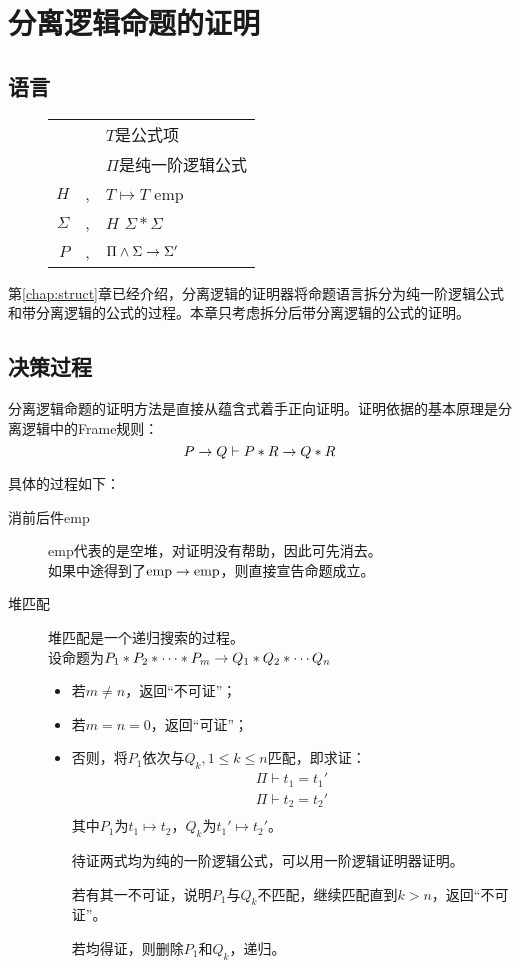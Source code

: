 \chapter{分离逻辑命题的证明}
\label{chap:sep}

\section{语言}
\begin{figure}[!htbp]
  \centering
  \begin{tabular}[rcl]{rcl}
    & & $T$是公式项 \\
    & & $\Pi$是纯一阶逻辑公式 \\
    $H$ & \sep{} & $T \mapsto T$ \deli{} emp \\
    $\Sigma$ & \sep{} & $H$ \deli{} $\Sigma \ast \Sigma$ \\
    $P$ & \sep{} & $\Pi \land \Sigma \rightarrow \Sigma'$ \\
  \end{tabular}
\end{figure}
第\ref{chap:struct}章已经介绍，分离逻辑的证明器将命题语言拆分为纯一阶逻辑公式和带分离逻辑的公式的过程。本章只考虑拆分后带分离逻辑的公式的证明。

\section{决策过程}
分离逻辑命题的证明方法是直接从蕴含式着手正向证明。证明依据的基本原理是分离逻辑中的Frame规则：
$$ P \rightarrow Q \vdash P \ast R \rightarrow Q \ast R$$

具体的过程如下：
\begin{description}
  \item[消前后件emp] emp代表的是空堆，对证明没有帮助，因此可先消去。\\
    如果中途得到了$\mathrm{emp} \rightarrow \mathrm{emp}$，则直接宣告命题成立。
  \item[堆匹配] 堆匹配是一个递归搜索的过程。\\
    设命题为$P_1 \ast P_2 \ast \cdots \ast P_m \rightarrow Q_1 \ast Q_2 \ast \cdots Q_n$
    \begin{itemize}
      \item 若$m \neq n$，返回``不可证''；
      \item 若$m = n = 0$，返回``可证''；
      \item 否则，将$P_1$依次与$Q_k, 1 \leq k \leq n$匹配，即求证：
        \begin{eqnarray*}
          \Pi \vdash t_1 = t_1' \\
          \Pi \vdash t_2 = t_2' \\
        \end{eqnarray*}
        其中$P_1$为$t_1 \mapsto t_2$，$Q_k$为$t_1' \mapsto t_2'$。

        待证两式均为纯的一阶逻辑公式，可以用一阶逻辑证明器证明。

        若有其一不可证，说明$P_1$与$Q_k$不匹配，继续匹配直到$k > n$，返回``不可证''。

        若均得证，则删除$P_1$和$Q_k$，递归。
    \end{itemize}

\end{description}


